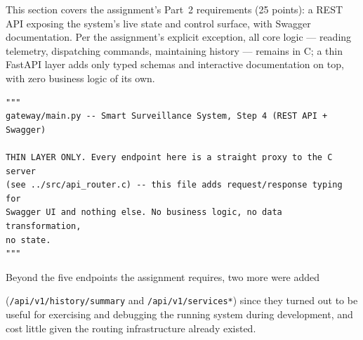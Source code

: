\label{sec:rest-api}


This section covers the assignment's Part~2 requirements (25 points): a
REST API exposing the system's live state and control surface, with
Swagger documentation. Per the assignment's explicit exception, all core
logic --- reading telemetry, dispatching commands, maintaining history ---
remains in C; a thin FastAPI layer adds only typed schemas and interactive
documentation on top, with zero business logic of its own.

\begin{lstlisting}[style=pythonstyle_bright_2026, caption={\texttt{gateway/main.py} --- the gateway's own docstring states its constraint plainly.}, label={code:gateway-constraint}]
"""
gateway/main.py -- Smart Surveillance System, Step 4 (REST API + Swagger)

THIN LAYER ONLY. Every endpoint here is a straight proxy to the C server
(see ../src/api_router.c) -- this file adds request/response typing for
Swagger UI and nothing else. No business logic, no data transformation,
no state.
"""
\end{lstlisting}


Beyond the five endpoints the assignment requires, two more were added

(\texttt{/api/v1/history/summary} and \texttt{/api/v1/services*}) since
they turned out to be useful for exercising and debugging the running
system during development, and cost little given the routing
infrastructure already existed.

